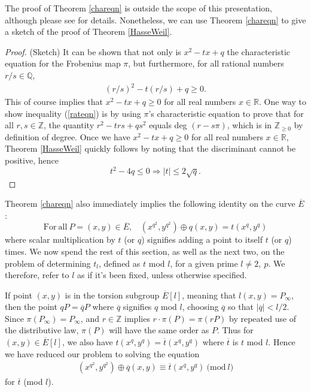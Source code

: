 \documentclass{article}
\newcommand{\q}{\mathbb{Q}}
\newcommand{\R}{\mathbb{R}}
\newcommand{\z}{\mathbb{Z}}
\begin{document}
\noindent The proof of Theorem \ref{chareqn} is outside the scope of this presentation, although please
see \cite{Wash} for details.  Nonetheless, we can use Theorem \ref{chareqn} to give a sketch of
the proof of Theorem \ref{HasseWeil}.

\begin{proof} (Sketch) It can be shown that not only is $x^2-tx+q$ the characteristic equation for
the Frobenius map $\pi$, but furthermore, for all rational numbers $r/s \in \q$,
\begin{eqnarray} \label{rateqn} (r/s)^2-t(r/s) + q \geq 0.\end{eqnarray}  This of course implies that $x^2 - tx + q \geq 0$ for all real
numbers $x \in \R$. One way to show inequality (\ref{rateqn}) is by using $\pi$'s characteristic
equation to prove that for all $r,s\in \z$, the quantity $r^2 - trs + qs^2$ equals deg $(r-s\pi)$,
which is in $\z_{\geq 0}$ by definition of degree. Once we have $x^2 - tx + q \geq 0$ for all real
numbers $x \in \R$, Theorem \ref{HasseWeil} quickly follows by noting that the discriminant cannot
be positive, hence
$$t^2 - 4q \leq 0 \Rightarrow |t| \leq 2\sqrt{q}.$$
\end{proof}

Theorem \ref{chareqn} also immediately implies the following identity on the curve $\overline{E}$:
$$\mathrm{For~all~}P=(x,y) \in \overline{E},~~~~(x^{q^2},y^{q^2}) \oplus q(x,y) = t(x^q,y^q)$$ where scalar multiplication by $t$ (or $q$)
signifies adding a point to itself $t$ (or $q$) times.  We now spend the rest of this section, as
well as the next two, on the problem of determining $t_l$, defined as $t$ mod $l$, for a given
prime $l \not = 2, ~p$. We therefore, refer to $l$ as if it's been fixed, unless otherwise
specified.

If point $(x,y)$ is in the torsion subgroup $\overline{E}[l]$, meaning that $l(x,y) = P_\infty$,
then the point $qP = \overline{q}P$ where $\overline{q}$ signifies $q$ mod $l$, choosing
$\overline{q}$ so that $|\overline{q}| < l/2$. Since $\pi(P_\infty) = P_\infty$, and $r \in \z$
implies $r \cdot\pi(P) = \pi(rP)$ by repeated use of the distributive law, $\pi(P)$ will have the
same order as $P$.  Thus for $(x,y) \in \overline{E}[l]$, we also have $ t(x^q,y^q) =
\overline{t}(x^q,y^q)$ where $\overline{t}$ is $t$ mod $l$. Hence we have reduced our problem to
solving the equation
\begin{eqnarray} \label{Ttosol} (x^{q^2},y^{q^2}) \oplus \overline{q}(x,y) \equiv
\overline{t}(x^q,y^q) \mathrm{~(mod~}l)\end{eqnarray} for $\overline{t}$ (mod $l$).
\end{document}
